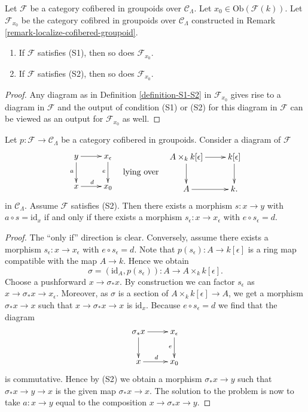 \begin{lemma}
\label{lemma-S1-S2-localize}
Let $\mathcal{F}$ be a category cofibered in groupoids over
$\mathcal{C}_\Lambda$. Let $x_0 \in \text{Ob}(\mathcal{F}(k))$.
Let $\mathcal{F}_{x_0}$ be the category cofibred in groupoids over
$\mathcal{C}_\Lambda$ constructed in
Remark \ref{remark-localize-cofibered-groupoid}.
\begin{enumerate}
\item If $\mathcal{F}$ satisfies (S1), then so does $\mathcal{F}_{x_0}$. 
\item If $\mathcal{F}$ satisfies (S2), then so does $\mathcal{F}_{x_0}$.
\end{enumerate}
\end{lemma}

\begin{proof}
Any diagram as in
Definition \ref{definition-S1-S2}
in $\mathcal{F}_{x_0}$ gives rise to a diagram in $\mathcal{F}$
and the output of condition (S1) or (S2) for this diagram in $\mathcal{F}$
can be viewed as an output for $\mathcal{F}_{x_0}$ as well.
\end{proof}

\begin{lemma}
\label{lemma-lifting-section}
Let $p: \mathcal{F} \to \mathcal{C}_\Lambda$ be a category cofibered in 
groupoids. Consider a diagram of $\mathcal{F}$
$$
\vcenter{
\xymatrix{
y \ar[r] \ar[d]_a & x_\epsilon \ar[d]_e \\
x \ar[r]^d        & x_0
}
}
\quad\text{lying over}\quad
\vcenter{
\xymatrix{
A \times_k k[\epsilon] \ar[r] \ar[d] & k[\epsilon] \ar[d] \\
A \ar[r] & k.
}
}
$$
in $\mathcal{C}_\Lambda$. Assume $\mathcal{F}$ satisfies (S2).
Then there exists a morphism $s : x \to y$ with $a \circ s = \text{id}_x$
if and only if there exists a morphism $s_\epsilon : x \to x_\epsilon$
with $e \circ s_\epsilon = d$.
\end{lemma}

\begin{proof}
The ``only if'' direction is clear.  Conversely, assume there exists a
morphism $s_\epsilon : x \to x_\epsilon$ with $e \circ s_\epsilon = d$.
Note that $p(s_\epsilon) : A \to k[\epsilon]$ is a ring map compatible
with the map $A \to k$. Hence we obtain
$$
\sigma = (\text{id}_A, p(s_\epsilon)) : A \to A \times_{k} k[\epsilon].
$$
Choose a pushforward $x \to \sigma_*x$. By construction we can factor
$s_\epsilon$ as $x \to \sigma_*x \to x_\epsilon$. Moreover, as $\sigma$
is a section of $A \times_k k[\epsilon] \to A$, we get a morphism
$\sigma_*x \to x$ such that $x \to \sigma_*x \to x$ is $\text{id}_x$.
Because $e \circ s_\epsilon = d$ we find that the diagram
$$
\xymatrix{
\sigma_*x \ar[r] \ar[d] & x_\epsilon \ar[d]_e \\
x \ar[r]^d        & x_0
}
$$
is commutative. Hence by (S2) we obtain a morphism $\sigma_*x \to y$
such that $\sigma_*x \to y \to x$ is the given map $\sigma_*x \to x$.
The solution to the problem is now to take $a : x \to y$ equal to
the composition $x \to \sigma_*x \to y$.
\end{proof}

